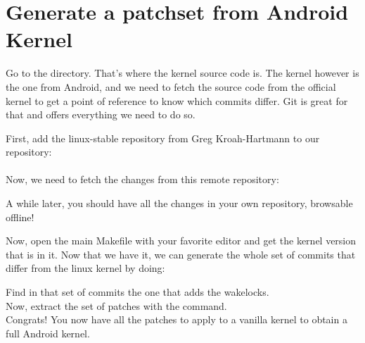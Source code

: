 \section{Generate a patchset from Android Kernel}

Go to the  directory. That's where the kernel source code is. The
kernel however is the one from Android, and we need to fetch the source code
from the official kernel to get a point of reference to know which commits
differ. Git is great for that and offers everything we need to do so.

First, add the linux-stable repository from Greg Kroah-Hartmann to our
repository:\\

\\

Now, we need to fetch the changes from this remote repository:


A while later, you should have all the changes in your own repository, browsable
offline!

Now, open the main Makefile with your favorite editor and get the kernel version
that is in it. Now that we have it, we can generate the whole set of commits that
differ from the linux kernel by doing:


Find in that set of commits the one that adds the wakelocks.\\

Now, extract the set of patches with the  command.\\

Congrats! You now have all the patches to apply to a vanilla kernel to obtain a
full Android kernel.
